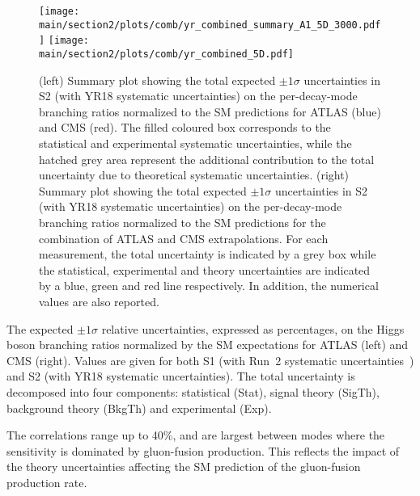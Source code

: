 \begin{figure}[hbtp]
\centering
\texttt{[image: \\main/section2/plots/comb/yr\_combined\_summary\_A1\_5D\_3000.pdf]}%
\texttt{[image: \\main/section2/plots/comb/yr\_combined\_5D.pdf]}%
\caption{(left) Summary plot showing the total expected $\pm 1\sigma$ uncertainties in S2 (with YR18 systematic uncertainties) on the  per-decay-mode branching ratios normalized to the SM predictions   for ATLAS (blue)  and CMS (red). The filled coloured box corresponds to the statistical and experimental systematic uncertainties, while the hatched grey area represent the additional contribution to the total uncertainty due to theoretical systematic uncertainties.
(right) Summary plot showing the total expected $\pm 1\sigma$  uncertainties in S2 (with YR18 systematic uncertainties) on the per-decay-mode branching ratios normalized to the SM predictions for the combination of ATLAS and CMS extrapolations. For each measurement,  the total uncertainty is indicated by a grey box while the statistical, experimental and theory uncertainties are indicated by a blue, green and red line respectively. In addition, the numerical values are also reported.}
\label{fig:summary_A1_5D}
\end{figure}


\begin{table}[hbtp]
\centering
\caption{The expected $\pm 1\sigma$ relative uncertainties, expressed as percentages, on the Higgs boson branching ratios normalized by the SM expectations for ATLAS (left) and CMS (right). Values are given for both S1 (with Run~2 systematic uncertainties~\cite{Sirunyan:2018koj}) and S2 (with YR18 systematic uncertainties). The total uncertainty is decomposed into four components: statistical (Stat), signal theory (SigTh), background theory (BkgTh) and experimental (Exp).}
\small
\hspace{0.5cm}

\label{tab:summary_A1_5D}
\vspace{0.5cm}
\end{table}


The correlations range up to 40\%, and are largest between modes where the sensitivity is dominated by gluon-fusion production. This reflects the impact of the theory uncertainties affecting the SM prediction of the gluon-fusion production rate.




